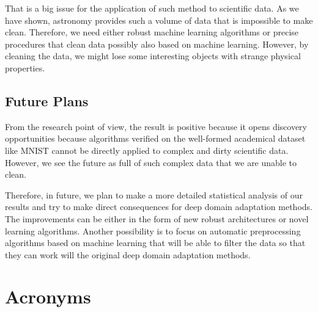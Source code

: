 \documentclass[thesis=M,english]{FITthesis}[2012/10/20]
\begin{document}
That is a big issue for the application of such method to scientific data.
As we have shown, astronomy provides such a volume of data that is impossible to make clean.
Therefore, we need either robust machine learning algorithms or precise procedures
that clean data possibly also based on machine learning.
However, by cleaning the data, we might lose some interesting objects with strange physical properties.

\section{Future Plans}

From the research point of view, the result is positive because it opens discovery opportunities because algorithms verified on the well-formed academical dataset like MNIST cannot be directly applied to complex and dirty scientific data. However, we see the future as full of such complex data that we are unable to clean.

Therefore, in future, we plan to make a more detailed statistical analysis of our results and try to make direct consequences for deep domain adaptation methods. The improvements can be either in the form of new robust architectures or novel learning algorithms. Another possibility is to focus on automatic preprocessing algorithms based on machine learning that will be able to filter the data so that they can work will the original deep domain adaptation methods.




\appendix

\chapter{Acronyms}
\end{document}

